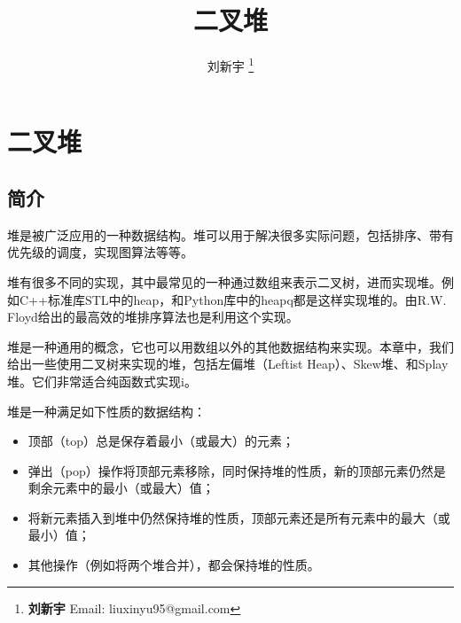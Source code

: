 \documentclass[UTF8]{article}
\begin{document}


\title{二叉堆}

\author{刘新宇
\thanks{{\bfseries 刘新宇 } \newline
  Email: liuxinyu95@gmail.com \newline}
  }

\maketitle
\fi


\ifx\wholebook\relax
\chapter{二叉堆}
\fi

\section{简介}
\label{introduction}

堆是被广泛应用的一种数据结构。堆可以用于解决很多实际问题，包括排序、带有优先级的调度，实现图算法等等\cite{wiki-heap}。

堆有很多不同的实现，其中最常见的一种通过数组来表示二叉树\cite{CLRS}，进而实现堆。例如C++标准库STL中的heap，和Python库中的heapq都是这样实现堆的。由R.W. Floyd给出的最高效的堆排序算法也是利用这个实现\cite{wiki-heapsort}\cite{rosetta-heapsort}。

堆是一种通用的概念，它也可以用数组以外的其他数据结构来实现。本章中，我们给出一些使用二叉树来实现的堆，包括左偏堆（Leftist Heap）、Skew堆、和Splay堆。它们非常适合纯函数式实现i\cite{okasaki-book}。

堆是一种满足如下性质的数据结构：
\begin{itemize}
\item 顶部（top）总是保存着最小（或最大）的元素；
\item 弹出（pop）操作将顶部元素移除，同时保持堆的性质，新的顶部元素仍然是剩余元素中的最小（或最大）值；
\item 将新元素插入到堆中仍然保持堆的性质，顶部元素还是所有元素中的最大（或最小）值；
\item 其他操作（例如将两个堆合并），都会保持堆的性质。
\end{itemize}
\end{document}
